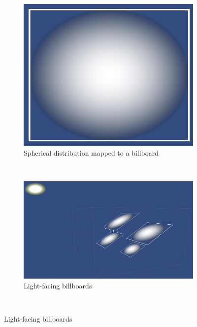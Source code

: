 \begin{figure}[t]
\centering
	\begin{subfigure}[t]{0.48\textwidth}
	\includegraphics[width=\textwidth]{../res/spherebillboard.png}
	\caption{Spherical distribution mapped to a billboard}
	\end{subfigure}
	~
	\begin{subfigure}[t]{0.48\textwidth}
	\includegraphics[width=\textwidth]{../res/lightfacing.png}
	\caption{Light-facing billboards}
	\end{subfigure}
	~

\end{figure}
